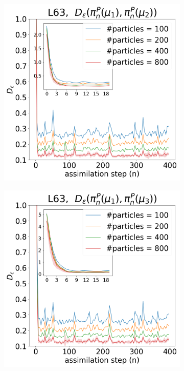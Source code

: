 \begin{figure}[!t]
\begin{subfigure}{0.3\textwidth}
\includegraphics[width=\columnwidth]{numerical-fs/plots/figures-BPF-L63-1-dist_1_vs_2.png}
\end{subfigure}\hspace{0mm}%
\begin{subfigure}{0.3\textwidth}
\includegraphics[width=\columnwidth]{numerical-fs/plots/figures-BPF-L63-1-dist_1_vs_3.png}

\end{subfigure}
\end{figure}
